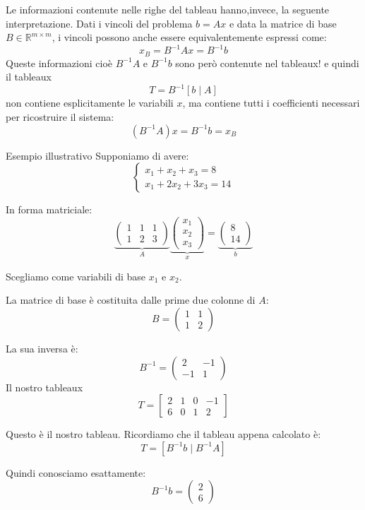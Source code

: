 Le informazioni contenute nelle righe del tableau hanno,invece, la seguente interpretazione.
Dati i vincoli del problema $b = Ax$ e data la matrice di base $B \in \mathbb{R} ^ {m \times m}$, i vincoli possono anche essere equivalentemente espressi come:
\[
x_B = B^{-1} Ax = B^{-1} b  
\]
Queste informazioni cioè $B^{-1}A $ e $B^{-1} b $ sono però contenute nel tableaux!
e quindi il tableaux 
\[
\boxed{T=B^{-1}[b\mid A]}
\]
non contiene esplicitamente le variabili \(x\), ma contiene tutti i coefficienti necessari per ricostruire il sistema:
\[
\boxed{(B^{-1}A)x=B^{-1}b = x_B} 
\]
\begin{example}{Esempio illustrativo}
    Supponiamo di avere:
\[
\begin{cases}
x_1+x_2+x_3=8\\
x_1+2x_2+3x_3=14
\end{cases}
\]

In forma matriciale:
\[
\underbrace{
\begin{pmatrix}
1&1&1\\
1&2&3
\end{pmatrix}}_{A}
\underbrace{
\begin{pmatrix}
x_1\\x_2\\x_3
\end{pmatrix}}_{x}
=
\underbrace{
\begin{pmatrix}
8\\14
\end{pmatrix}}_{b}
\]

Scegliamo come variabili di base \(x_1\) e \(x_2\).

La matrice di base è costituita dalle prime due colonne di \(A\):
\[
B=
\begin{pmatrix}
1&1\\
1&2
\end{pmatrix}
\]

La sua inversa è:
\[
\boxed{
B^{-1}=
\begin{pmatrix}
2&-1\\
-1&1
\end{pmatrix}
}
\]
Il nostro tableaux
\[
\boxed{
T=
\left[
\begin{array}{c|ccc}
2&1&0&-1\\
6&0&1&2
\end{array}
\right]
}
\]

Questo è il nostro tableau.
Ricordiamo che il tableau appena calcolato è:
\[
T=[B^{-1}b\mid B^{-1}A]
\]

Quindi conosciamo esattamente:
\[
B^{-1}b=
\begin{pmatrix}
2\\6
\end{pmatrix}
\]


\end{example}
